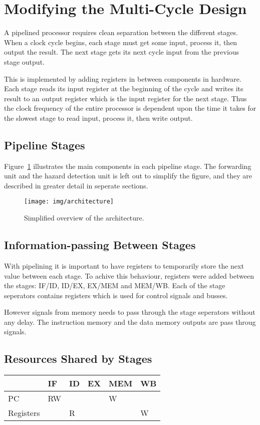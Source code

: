 \section{Modifying the Multi-Cycle Design}
A pipelined processor requires clean separation between the different stages.
When a clock cycle begins, each stage must get some input, process it, then output the result.
The next stage gets its next cycle input from the previous stage output.

This is implemented by adding registers in between components in hardware.
Each stage reads its input register at the beginning of the cycle and writes its result to an output register which is the input register for the next stage.
Thus the clock frequency of the entire processor is dependent upon the time it takes for the slowest stage to read input, process it, then write output.

\subsection{Pipeline Stages}
Figure~\ref{fig:architecture} illustrates the main components in each pipeline stage.
The forwarding unit and the hazard detection unit is left out to simplify the figure,
and they are described in greater detail in seperate sections.

\begin{figure}[h]
    \centering
    \texttt{[image: img/architecture]}
    \caption{
      Simplified overview of the architecture.
    }
    \label{fig:architecture}
\end{figure}

\subsection{Information-passing Between Stages}
With pipelining it is important to have registers to temporarily store the next value between each stage.
To achive this behaviour, registers were added between the stages:
IF/ID, ID/EX, EX/MEM and MEM/WB.
Each of the stage seperators contains registers which is used for control signals and busses.

However signals from memory needs to pass through the stage seperators without any delay.
The instruction memory and the data memory outputs are pass throug signals.

\subsection{Resources Shared by Stages}
\begin{table}[h]
    \begin{tabular}{l|lllll}
    ~         & IF & ID & EX & MEM & WB \\ \hline
    PC        & RW & ~  & ~  & W   & ~  \\
    Registers & ~  & R  & ~  & ~   & W  \\
    \end{tabular}
\end{table}
